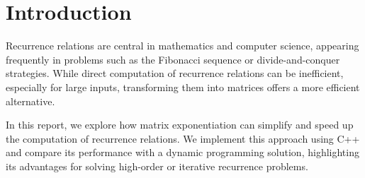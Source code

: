 \section{Introduction}
Recurrence relations are central in mathematics and computer science, appearing frequently in problems such as the Fibonacci sequence or divide-and-conquer strategies. While direct computation of recurrence relations can be inefficient, especially for large inputs, transforming them into matrices offers a more efficient alternative.

In this report, we explore how matrix exponentiation can simplify and speed up the computation of recurrence relations. We implement this approach using C++ and compare its performance with a dynamic programming solution, highlighting its advantages for solving high-order or iterative recurrence problems.

